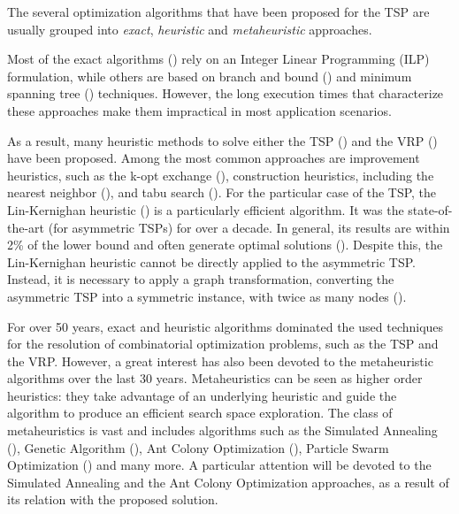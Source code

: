 \documentclass[onecolumn]{elsarticle}
\begin{document}
The several optimization algorithms that have been proposed for the TSP are usually grouped into \textit{exact}, \textit{heuristic} and \textit{metaheuristic} approaches. 

Most of the exact algorithms (\cite{tsp_exact,vrp_exact}) rely on an Integer Linear Programming (ILP) formulation, while others are based on branch and bound (\cite{bnb_old,bnb_new}) and minimum spanning tree (\cite{trees}) techniques. However, the long execution times that characterize these approaches make them impractical in most application scenarios.

As a result, many heuristic methods to solve either the TSP (\cite{tsp_heuristics}) and the VRP (\cite{vrp_heuristics}) have been proposed. Among the most common approaches are improvement heuristics, such as the k-opt exchange (\cite{heuristics_tsp}), construction heuristics, including the nearest neighbor (\cite{tsp_exact}), and tabu search (\cite{tabu}). For the particular case of the TSP, the Lin-Kernighan heuristic (\cite{lk_alg}) is a particularly efficient algorithm. It was the state-of-the-art (for asymmetric TSPs) for over a decade. In general, its results are within 2\% of the lower bound and often generate optimal solutions (\cite{local_search_book}). Despite this, the Lin-Kernighan heuristic cannot be directly applied to the asymmetric TSP. Instead, it is necessary to apply a graph transformation, converting the asymmetric TSP into a symmetric instance, with twice as many nodes (\cite{atsp_transformation}).

For over 50 years, exact and heuristic algorithms dominated the used techniques for the resolution of combinatorial optimization problems, such as the TSP and the VRP. However, a great interest has also been devoted to the metaheuristic algorithms over the last 30 years. Metaheuristics can be seen as higher order heuristics: they take advantage of an underlying heuristic and guide the algorithm to produce an efficient search space exploration. The class of metaheuristics is vast and includes algorithms such as the Simulated Annealing (\cite{SA_1}), Genetic Algorithm (\cite{genetic}), Ant Colony Optimization (\cite{aco}), Particle Swarm Optimization (\cite{swarm}) and many more. A particular attention will be devoted to the Simulated Annealing and the Ant Colony Optimization approaches, as a result of its relation with the proposed solution.
\end{document}
